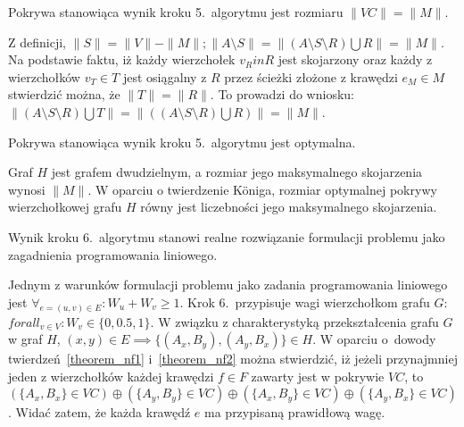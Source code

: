 \begin{theorem}
  Pokrywa stanowiąca wynik kroku 5.\ algorytmu jest rozmiaru $\|VC\| = \|M\|$. 
\end{theorem}
\begin{bproof}
  Z definicji, $\|S\| = \|V\| - \|M\|; \|A \setminus S\|=\|(A \setminus S
  \setminus R) \bigcup R\|=\|M\|$.\\
  Na podstawie faktu, iż każdy wierzchołek $v_R in R$ jest skojarzony oraz
  każdy z wierzchołków $v_T \in T$ jest osiągalny z $R$ przez ścieżki złożone z
  krawędzi $e_M \in M$ stwierdzić można, że $\|T\|=\|R\|$.
  To prowadzi do wniosku: $\|(A\setminus S\setminus R)\bigcup T\|=\|((A \setminus
  S \setminus R) \bigcup R)\|=\|M\|$.
\end{bproof}
\begin{theorem}\label{theorem_nf2}
  Pokrywa stanowiąca wynik kroku 5.\ algorytmu jest optymalna.
\end{theorem}
\begin{bproof}
  Graf $H$ jest grafem dwudzielnym, a rozmiar jego maksymalnego skojarzenia
  wynosi $\|M\|$.
  W oparciu o twierdzenie K\"oniga, rozmiar optymalnej pokrywy wierzchołkowej
  grafu $H$ równy jest liczebności jego maksymalnego skojarzenia.
\end{bproof}
\begin{theorem}
  Wynik kroku 6.~algorytmu stanowi realne rozwiązanie formulacji problemu jako
  zagadnienia programowania liniowego.
\end{theorem}
\begin{bproof}
  Jednym z warunków formulacji problemu jako zadania programowania liniowego jest
  $\forall_{e=(u,v) \in E}: W_u + W_v \geq 1$.
  Krok 6.\ przypisuje wagi wierzchołkom grafu $G$: ${forall_{v \in V}: W_v \in
  \{0, 0.5, 1\}}$.
  W związku z charakterystyką przekształcenia grafu $G$ w graf $H$, 
  $(x,y) \in E \implies \{(A_x, B_y), (A_y, B_x)\} \in H$.
  W oparciu o~dowody twierdzeń~\ref{theorem_nf1} i~\ref{theorem_nf2} można
  stwierdzić, iż jeżeli przynajmniej jeden z wierzchołków każdej krawędzi $f \in
  F$ zawarty jest w pokrywie $VC$, to $(\{A_x, B_x\} \in VC) \oplus (\{A_y,
  B_y\} \in VC) \oplus (\{A_x, B_y\} \in VC) \oplus (\{A_y, B_x\} \in VC)$.
  Widać zatem, że każda krawędź $e$ ma przypisaną prawidłową wagę.
\end{bproof}
